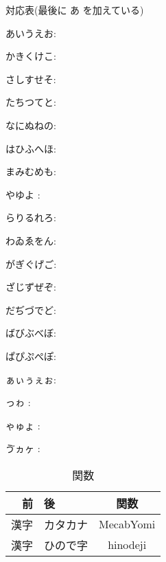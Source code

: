 \documentclass[a4paper]{ltjsarticle}
\begin{document}
対応表(最後に あ を加えている)\par
あいうえお: \par
かきくけこ: \par
さしすせそ: \par
たちつてと: \par
なにぬねの: \par
はひふへほ: \par
まみむめも: \par
やゆよ	: \par
らりるれろ: \par
わゐゑをん: \par
がぎぐげご: \par
ざじずぜぞ: \par
だぢづでど: \par
ばびぶべぼ: \par
ぱぴぷぺぽ: \par
ぁぃぅぇぉ: \par
っゎ		: \par
ゃゅょ	: \par
ゔヵヶ	: \par

\begin{table}[tb]
	\caption{関数}
	\label{tab:functions}
	\centering

	\begin{tabular}{rl|c}
	\hline

	\hline
	\textbf{前} & \textbf{後} & \textbf{関数} \\
	\hline
		 漢字 & カタカナ & MecabYomi \\
		 漢字 & ひので字 & hinodeji \\
	\hline

	\hline
	\end{tabular}
\end{table}

\newpage
\end{document}
